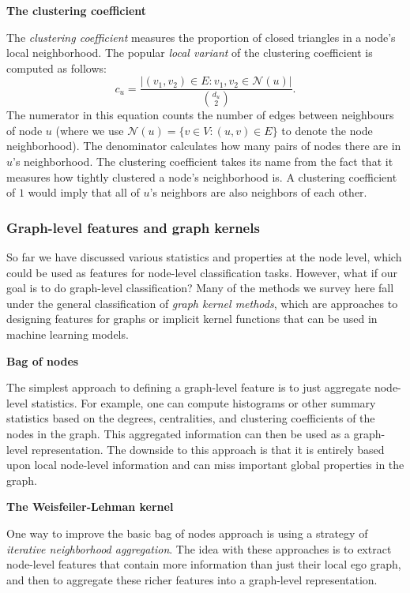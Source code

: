 \documentclass[10pt]{book}
\let\defaultmarginpar\marginpar
\renewcommand\marginpar[2][]{\defaultmarginpar{\itshape\color{gray}#2}}
\begin{document}
\textbf{The clustering coefficient}

The \emph{clustering coefficient}\marginpar{clustering coefficient} measures the proportion of closed triangles in a node's local neighborhood. The popular \emph{local variant} of the clustering coefficient is computed as follows:
\begin{equation}
    c_u = \frac{|(v_1, v_2) \in E: v_1, v_2 \in \mathcal N(u)|}{\binom{d_u}2}.
\end{equation}
The numerator in this equation counts the number of edges between neighbours of node $u$ (where we use $\mathcal N(u) = \{v \in V: (u, v) \in E\}$ to denote the node neighborhood). The denominator calculates how many pairs of nodes there are in $u$'s neighborhood. The clustering coefficient takes its name from the fact that it measures how
tightly clustered a node's neighborhood is. A clustering coefficient of $1$ would imply that all of $u$'s neighbors are also neighbors of each other.

\subsubsection{Graph-level features and graph kernels}

So far we have discussed various statistics and properties at the node level, which could be used as features for node-level classification tasks. However, what if our goal is to do graph-level classification? Many of the methods we survey here fall under the general classification of \emph{graph kernel methods}, which are approaches to designing features for graphs or implicit kernel functions that can be used in machine learning models.
\smallskip

\textbf{Bag of nodes}

The simplest approach to defining a graph-level feature is to just aggregate node-level statistics. For example, one can compute histograms or other summary statistics based on the degrees, centralities, and clustering coefficients of the nodes in the graph. This aggregated information can then be used as a graph-level representation. The downside to this approach is that it is entirely based upon local node-level information and can miss important global properties in the graph.
\smallskip

\textbf{The Weisfeiler-Lehman kernel}

One way to improve the basic bag of nodes approach is using a strategy of \emph{iterative neighborhood aggregation}. The idea with these approaches is to extract node-level features that contain more information than just their local ego graph, and then to aggregate these richer features into a graph-level representation.
\end{document}
